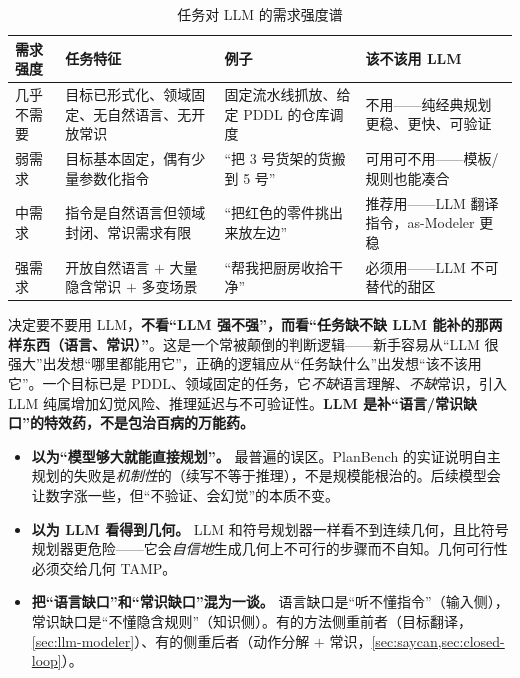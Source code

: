\begin{table}[H]\centering\small
\caption{任务对 LLM 的需求强度谱}
\label{tab:llm-demand}
\begin{tabular}{p{2.0cm}p{4.2cm}p{3.6cm}p{3.2cm}}
\toprule
需求强度 & 任务特征 & 例子 & 该不该用 LLM \\
\midrule
几乎不需要 & 目标已形式化、领域固定、无自然语言、无开放常识 & 固定流水线抓放、给定 PDDL 的仓库调度 & 不用——纯经典规划更稳、更快、可验证 \\
弱需求 & 目标基本固定，偶有少量参数化指令 & “把 3 号货架的货搬到 5 号” & 可用可不用——模板/规则也能凑合 \\
中需求 & 指令是自然语言但领域封闭、常识需求有限 & “把红色的零件挑出来放左边” & 推荐用——LLM 翻译指令，as-Modeler 更稳 \\
强需求 & 开放自然语言 $+$ 大量隐含常识 $+$ 多变场景 & “帮我把厨房收拾干净” & 必须用——LLM 不可替代的甜区 \\
\bottomrule
\end{tabular}
\end{table}

\begin{insight}
决定要不要用 LLM，\textbf{不看“LLM 强不强”，而看“任务缺不缺 LLM 能补的那两样东西（语言、常识）”}。这是一个常被颠倒的判断逻辑——新手容易从“LLM 很强大”出发想“哪里都能用它”，正确的逻辑应从“任务缺什么”出发想“该不该用它”。一个目标已是 PDDL、领域固定的任务，它\emph{不缺}语言理解、\emph{不缺}常识，引入 LLM 纯属增加幻觉风险、推理延迟与不可验证性。\textbf{LLM 是补“语言/常识缺口”的特效药，不是包治百病的万能药。}
\end{insight}

\begin{pitfall}[本节常见陷阱]
\begin{itemize}
  \item \textbf{以为“模型够大就能直接规划”。} 最普遍的误区。PlanBench 的实证\cite{valmeekam2023planbench}说明自主规划的失败是\emph{机制性}的（续写不等于推理），不是规模能根治的。后续模型会让数字涨一些，但“不验证、会幻觉”的本质不变。
  \item \textbf{以为 LLM 看得到几何。} LLM 和符号规划器一样看不到连续几何，且比符号规划器更危险——它会\emph{自信地}生成几何上不可行的步骤而不自知。几何可行性必须交给几何 TAMP。
  \item \textbf{把“语言缺口”和“常识缺口”混为一谈。} 语言缺口是“听不懂指令”（输入侧），常识缺口是“不懂隐含规则”（知识侧）。有的方法侧重前者（目标翻译，\cref{sec:llm-modeler}）、有的侧重后者（动作分解 $+$ 常识，\cref{sec:saycan,sec:closed-loop}）。
\end{itemize}
\end{pitfall}

